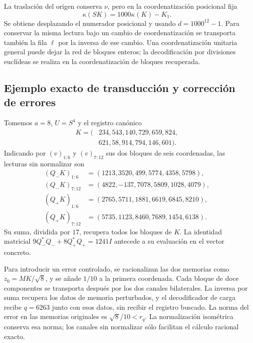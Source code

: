 La traslación del origen conserva \(\nu\), pero en la coordenatización
posicional fija
\begin{equation}
 \kappa(SK)=1000\kappa(K)-K_1.
 \label{lib04:cambio-origen}
\end{equation}
Se obtiene desplazando el numerador posicional y usando
\(d=1000^{12}-1\). Para conservar la misma lectura bajo un cambio
de coordenatización se transporta también la fila \(\ell\) por la inversa
de ese cambio. Una coordenatización unitaria general puede dejar la red de
bloques enteros; la decodificación por divisiones euclídeas se realiza
en la coordenatización de bloques recuperada.

\subsection{Ejemplo exacto de transducción y corrección de errores}
\label{lib04:ejemplo}

Tomemos \(a=8\), \(U=S^4\) y el registro canónico
\begin{equation}
 \begin{split}
 K=(&234,543,140,729,659,824,\\
    &621,58,914,794,146,601).
 \end{split}
 \label{lib04:k-ejemplo}
\end{equation}
Indicando por \((v)_{1:6}\) y \((v)_{7:12}\) sus dos bloques de
seis coordenadas, las lecturas sin normalizar son
\begin{align}
 (Q_-K)_{1:6}&=(1213,3520,499,5774,4358,5798),\nonumber\\
 (Q_-K)_{7:12}&=(4822,-137,7078,5809,1028,4079),\nonumber\\
 (Q_+K)_{1:6}&=(2765,5711,1881,6619,6845,8210),\nonumber\\
 (Q_+K)_{7:12}&=(5735,1123,8460,7689,1454,6138).
 \label{lib04:canales-ejemplo}
\end{align}
Su suma, dividida por \(17\), recupera todos los bloques de \(K\).
La identidad matricial
\(9Q_-^*Q_-+8Q_+^*Q_+=1241I\) antecede a su evaluación en el
vector concreto.

Para introducir un error controlado, se racionalizan las dos memorias
como \(z_0=MK/\sqrt8\), y se añade \(1/10\) a la primera
coordenada. Cada bloque de doce componentes se transporta después
por los dos canales bilaterales. La inversa por suma recupera los
datos de memoria perturbados, y el decodificador de carga recibe
\(q=6263\) junto con esos datos, sin recibir el registro buscado.
La norma del error en las memorias originales es
\(\sqrt8/10<r_q\). La normalización isométrica conserva esa norma;
los canales sin normalizar sólo facilitan el cálculo racional exacto.


